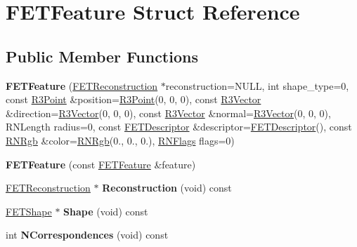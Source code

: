 \hypertarget{struct_f_e_t_feature}{}\section{F\+E\+T\+Feature Struct Reference}
\label{struct_f_e_t_feature}
\subsection*{Public Member Functions}
\begin{DoxyCompactItemize}
\item 
{\bfseries F\+E\+T\+Feature} (\hyperlink{struct_f_e_t_reconstruction}{F\+E\+T\+Reconstruction} $\ast$reconstruction=N\+U\+LL, int shape\+\_\+type=0, const \hyperlink{class_r3_point}{R3\+Point} \&position=\hyperlink{class_r3_point}{R3\+Point}(0, 0, 0), const \hyperlink{class_r3_vector}{R3\+Vector} \&direction=\hyperlink{class_r3_vector}{R3\+Vector}(0, 0, 0), const \hyperlink{class_r3_vector}{R3\+Vector} \&normal=\hyperlink{class_r3_vector}{R3\+Vector}(0, 0, 0), R\+N\+Length radius=0, const \hyperlink{struct_f_e_t_descriptor}{F\+E\+T\+Descriptor} \&descriptor=\hyperlink{struct_f_e_t_descriptor}{F\+E\+T\+Descriptor}(), const \hyperlink{class_r_n_rgb}{R\+N\+Rgb} \&color=\hyperlink{class_r_n_rgb}{R\+N\+Rgb}(0., 0., 0.), \hyperlink{class_r_n_flags}{R\+N\+Flags} flags=0)\hypertarget{struct_f_e_t_feature_ad1c6a7d5bda14cfc2da08c06a838ea65}{}\label{struct_f_e_t_feature_ad1c6a7d5bda14cfc2da08c06a838ea65}

\item 
{\bfseries F\+E\+T\+Feature} (const \hyperlink{struct_f_e_t_feature}{F\+E\+T\+Feature} \&feature)\hypertarget{struct_f_e_t_feature_ad5d009aa5f38249123f5e0792670c680}{}\label{struct_f_e_t_feature_ad5d009aa5f38249123f5e0792670c680}

\item 
\hyperlink{struct_f_e_t_reconstruction}{F\+E\+T\+Reconstruction} $\ast$ {\bfseries Reconstruction} (void) const \hypertarget{struct_f_e_t_feature_a28cbe73083a0b29e075eda3c50a78d82}{}\label{struct_f_e_t_feature_a28cbe73083a0b29e075eda3c50a78d82}

\item 
\hyperlink{struct_f_e_t_shape}{F\+E\+T\+Shape} $\ast$ {\bfseries Shape} (void) const \hypertarget{struct_f_e_t_feature_aa05a7f7ff6db58f969d4520ccad54258}{}\label{struct_f_e_t_feature_aa05a7f7ff6db58f969d4520ccad54258}

\item 
int {\bfseries N\+Correspondences} (void) const \hypertarget{struct_f_e_t_feature_ab2ab1b763963f457ef44bc0cf5849072}{}\label{struct_f_e_t_feature_ab2ab1b763963f457ef44bc0cf5849072}


\end{DoxyCompactItemize}
